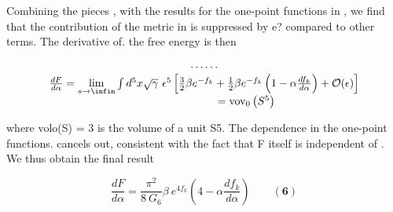 \documentclass{article}
\begin{document}
Combining the pieces , with the results for the one-point functions in , we find that the
contribution of the metric in is suppressed by e? compared to other terms. The derivative of.
the free energy is then


\begin{equation}
\begin{array} { c c } { \cdots \cdots } \\ { \frac { d F } { d \alpha } = \underset { s \rightarrow \infin } { \mathrm { l i m } } \int d ^ { 5 } x \sqrt { \gamma } ~ \epsilon ^ { 5 } \left [ \frac { 3 } { 2 } \beta e ^ { - f _ { k } } + \frac { 1 } { 2 } \beta e ^ { - f _ { k } } \left ( 1 - \alpha \frac { d f _ { k } } { d \alpha } \right ) + \mathcal { O } ( \epsilon ) \right ] } \\ { \qquad \qquad \qquad \qquad = \mathrm { v o v } _ { 0 } \left ( S ^ { 5 } \right ) ~}\end{array}
\end{equation}


where volo(S) = 3 is the volume of a unit S5. The  dependence in the one-point functions.
cancels out, consistent with the fact that F itself is independent of . We thus obtain the
final result


\begin{equation}
\frac { d F } { d \alpha } = \frac { \pi ^ { 2 } } { 8 ~ G _ { 6 } } \beta ~ e ^ { 4 f _ { k } } \left ( 4 - \alpha \frac { d f _ { k } } { d \alpha } \right ) \qquad ( \mathbf { 6 } )
\end{equation}
\end{document}

